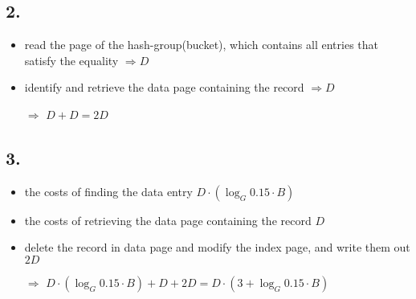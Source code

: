 \documentclass[12pt]{article}
\begin{document}
	\subsection*{2.}
		\begin{itemize}
			\item read the page of the hash-group(bucket), which contains all entries that satisfy the equality $\Rightarrow D$
			\item identify and retrieve the data page containing the record $\Rightarrow D$
			\item[$\Rightarrow$] $D+D=2D$
		\end{itemize}
	\subsection*{3.}
		\begin{itemize}
			\item the costs of finding the data entry $D\cdot (\log_G 0.15\cdot B)$
			\item the costs of retrieving the data page containing the record $D$
			\item delete the record in data page and modify the index page, and write them out $2D$
			\item[$\Rightarrow$] $D\cdot (\log_G 0.15\cdot B) + D + 2D = D\cdot (3+\log_G 0.15\cdot B)$
		\end{itemize}
	
\end{document}
